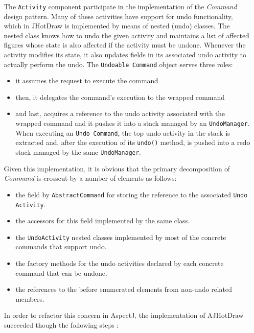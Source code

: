 The \texttt{Activity} component participate in the implementation of the \textit{Command} design pattern\cite{gamma1995design}. 
Many of these activities have support for undo functionality, which in JHotDraw is implemented by means of nested (undo) classes. 
The nested class knows how to undo the given activity and maintains a list of affected figures whose state is also affected if the activity must be undone. 
Whenever the activity modifies its state, it also updates fields in its associated undo activity to actually perform the undo. 
The \texttt{Undoable Command} object serves three roles: 
\begin{itemize}
	\item it assumes the request to execute the command
	\item then, it delegates the command's execution to the wrapped command 
	\item and last, acquires a reference to the undo activity associated with the wrapped command and it pushes it into a stack managed by an \texttt{UndoManager}. 
	When executing an \texttt{Undo Command}, the top undo activity in the stack is extracted and, after the execution of its \texttt{undo()} method, is pushed into a redo stack managed  by the same \texttt{UndoManager}.
\end{itemize}

Given this implementation, it is obvious that the primary decomposition of \textit{Command} is crosscut by a number of elements as follows: 

\begin{itemize}
	\item the field by \texttt{AbstractCommand} for storing the reference to the associated \texttt{Undo Activity}.

	\item the accessors for this field implemented by the same class.
	\item the \texttt{UndoActivity} nested classes implemented by most of the concrete commands that support undo.

	\item the factory methods for the undo activities declared by each concrete command that can be undone.
	
	\item the references to the before enumerated elements from non-undo related members.
\end{itemize}

In order to refactor this concern in AspectJ, the implementation of AJHotDraw succeeded though the following steps \cite{marin2004refactoring}:

